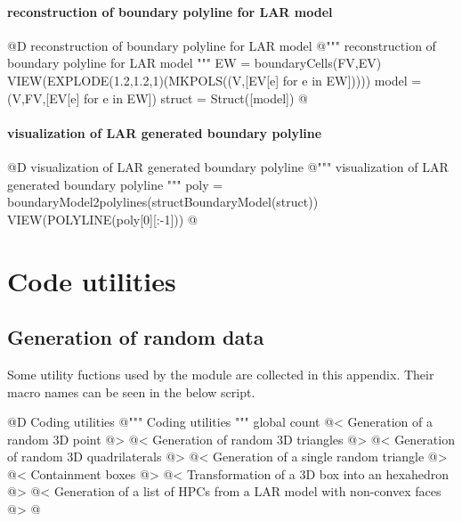 \documentclass[11pt,oneside]{article}    %
\begin{document}
\paragraph{reconstruction of boundary polyline for LAR model}
@D reconstruction of boundary polyline for LAR model
@{""" reconstruction of boundary polyline for LAR model """
EW = boundaryCells(FV,EV)
VIEW(EXPLODE(1.2,1.2,1)(MKPOLS((V,[EV[e] for e in EW]))))
model = (V,FV,[EV[e] for e in EW])
struct = Struct([model])
@}

\paragraph{visualization of LAR generated boundary polyline}
@D visualization of LAR generated boundary polyline
@{""" visualization of LAR generated boundary polyline """
poly = boundaryModel2polylines(structBoundaryModel(struct))
VIEW(POLYLINE(poly[0][:-1]))
@}



\appendix
\section{Code utilities}

\subsection{Generation of random data}

Some utility fuctions used by the module are collected in this appendix. Their macro names can be seen in the below script.

@D Coding utilities
@{""" Coding utilities """
global count
@< Generation of a random 3D point @>
@< Generation of random 3D triangles @>
@< Generation of random 3D quadrilaterals @>
@< Generation of a single random triangle @>
@< Containment boxes @>
@< Transformation of a 3D box into an hexahedron @>
@< Generation of a list of HPCs from a LAR model with non-convex faces @>
@}
\end{document}
